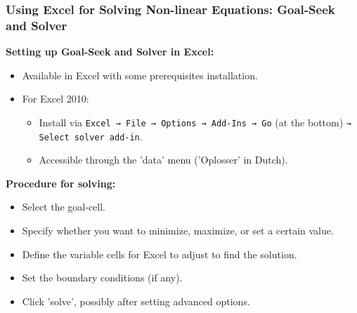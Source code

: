 \begin{frame}[fragile]
  \frametitle{Using Excel for Solving Non-linear Equations: Goal-Seek and Solver}

  \textbf{Setting up Goal-Seek and Solver in Excel:}
  \begin{itemize}
    \item Available in Excel with some prerequisites installation.
    \item For Excel 2010:
          \begin{itemize}
            \item Install via \texttt{Excel → File → Options → Add-Ins → Go} (at the bottom) \texttt{→ Select solver add-in}.
            \item Accessible through the 'data' menu ('Oplosser' in Dutch).
          \end{itemize}
  \end{itemize}

  \textbf{Procedure for solving:}
  \begin{itemize}
    \item Select the goal-cell.
    \item Specify whether you want to minimize, maximize, or set a certain value.
    \item Define the variable cells for Excel to adjust to find the solution.
    \item Set the boundary conditions (if any).
    \item Click 'solve', possibly after setting advanced options.
  \end{itemize}
\end{frame}

